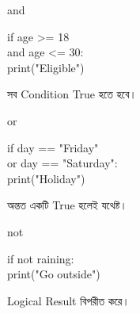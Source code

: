 \noindent
\begin{minipage}[t]{0.32\linewidth}

\begin{sideexamplebox}{\textenglish{\ttfamily and}}

\begin{sidecodebox}
\begin{english}
\ttfamily
if age >= 18\\
\hspace*{3mm}and age <= 30:\\
\hspace*{4mm}print("Eligible")
\end{english}
\end{sidecodebox}

সব Condition True হতে হবে।

\end{sideexamplebox}

\end{minipage}
\hfill
\begin{minipage}[t]{0.32\linewidth}

\begin{sideexamplebox}{\textenglish{\ttfamily or}}

\begin{sidecodebox}
\begin{english}
\ttfamily
if day == "Friday"\\
\hspace*{3mm}or day == "Saturday":\\
\hspace*{4mm}print("Holiday")
\end{english}
\end{sidecodebox}

অন্তত একটি True হলেই যথেষ্ট।

\end{sideexamplebox}

\end{minipage}
\hfill
\begin{minipage}[t]{0.32\linewidth}

\begin{sideexamplebox}{\textenglish{\ttfamily not}}

\begin{sidecodebox}
\begin{english}
\ttfamily
if not raining:\\
\hspace*{4mm}print("Go outside")
\end{english}
\end{sidecodebox}

Logical Result বিপরীত করে।

\end{sideexamplebox}

\end{minipage}

